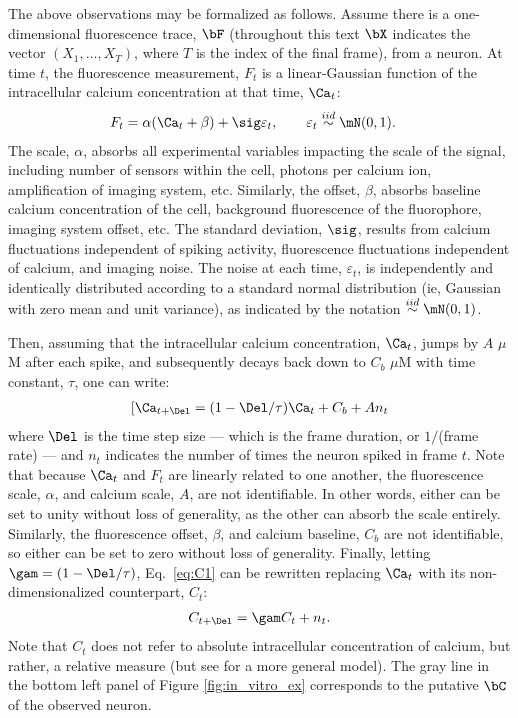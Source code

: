 The above observations may be formalized as follows. Assume there is a one-dimensional fluorescence trace, $\bF$ (throughout this text $\bX$ indicates the vector $(X_1, \ldots, X_T)$, where $T$ is the index of the final frame), from a neuron.  At time $t$, the fluorescence measurement, $F_t$ is a linear-Gaussian function of the intracellular calcium concentration at that time, $\Ca_t$:
\begin{align} \label{eq:F}
F_t &= \alpha (\Ca_t + \beta) + \sig \varepsilon_t, \qquad \varepsilon_t \overset{iid}{\sim} \mN(0,1).
\end{align}
\noindent The scale, $\alpha$, absorbs all experimental variables impacting the scale of the signal, including number of sensors within the cell, photons per calcium ion, amplification of imaging system, etc.  Similarly, the offset, $\beta$, absorbs baseline calcium concentration of the cell, background fluorescence of the fluorophore, imaging system offset, etc.  The standard deviation, $\sig$, results from calcium fluctuations independent of spiking activity, fluorescence fluctuations independent of calcium, and imaging noise. The noise at each time, $\varepsilon_t$, is independently and identically distributed according to a standard normal distribution (ie, Gaussian with zero mean and unit variance), as indicated by the notation $\overset{iid}{\sim}\mN(0,1)$. 

Then, assuming that the intracellular calcium concentration, $\Ca_t$, jumps by $A$ $\mu$M after each spike, and subsequently decays back down to $C_b$ $\mu$M with time constant, $\tau$, one can write:
\begin{align} \label{eq:C1}
[\Ca_{t+\Del} = (1- \Del/\tau ) \Ca_t + C_b + A n_t
\end{align}
\noindent where $\Del$ is the time step size --- which is the frame duration, or $1/$(frame rate) --- and $n_t$ indicates the number of times the neuron spiked in frame $t$. %
Note that because $\Ca_t$ and $F_t$ are linearly related to one another, the fluorescence scale, $\alpha$, and calcium scale, $A$, are not identifiable.  In other words, either can be set to unity without loss of generality, as the other can absorb the scale entirely. Similarly, the fluorescence offset, $\beta$, and calcium baseline, $C_b$ are not identifiable, so either can be set to zero without loss of generality.  Finally, letting $\gam=(1-\Del/\tau)$, Eq.~\eqref{eq:C1} can be rewritten replacing $\Ca_t$ with its non-dimensionalized counterpart, $C_t$: 
\begin{align} \label{eq:C2}
	 C_{t+\Del}=\gam C_t + n_t.
\end{align} 
\noindent Note that $C_t$ does not refer to absolute intracellular concentration of calcium, but rather, a relative measure (but see \cite{VogelsteinPaninski09} for a more general model).  The gray line in the bottom left panel of Figure \ref{fig:in_vitro_ex} corresponds to the putative $\bC$ of the observed neuron.  

